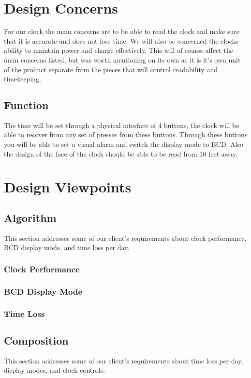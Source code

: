 \documentclass[10pt,draftclsnofoot,onecolumn]{IEEEtran}
\begin{document}
\section{Design Concerns}

For our clock the main concerns are to be able to read the clock and make sure that it is accurate and does not lose time.
We will also be concerned the clocks ability to maintain power and charge effectively.
This will of course affect the main concerns listed, but was worth mentioning on its own as it is it's own unit of the product separate from the pieces that will control readability and timekeeping.

\subsection{Function}
The time will be set through a physical interface of 4 buttons, the clock will be able to recover from any set of presses from these buttons. Through these buttons you will be able to set a visual alarm and switch the display mode to BCD. Also the design of the face of the clock should be able to be read from 10 feet away.

\section{Design Viewpoints}

\subsection{Algorithm}
This section addresses some of our client's requirements about clock performance, BCD display mode, and time loss per day.

\subsubsection{Clock Performance}

\subsubsection{BCD Display Mode}

\subsubsection{Time Loss}

\subsection{Composition}
This section addresses some of our client's requirements about time loss per day, display modes, and clock controls.
\end{document}
